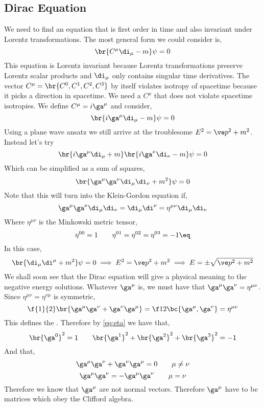 \documentclass{article}
\begin{document}
\subsection{Dirac Equation}
We need to find an equation that is first order in time and also invariant under Lorentz transformations. The most general form we could consider is,
\[ \br{C^{\mu} \di_{\mu} - m }\psi = 0 \]
This equation is Lorentz invariant because Lorentz transformations preserve Lorentz scalar products and $\di_{\mu}$ only contains singular time derivatives. The vector $C^{\mu} = \br{C^{0}, C^{1}, C^{2}, C^{3}}$ by itself violates isotropy of spacetime because it picks a direction in spacetime. We need a $C^{\mu}$ that does not violate spacetime isotropies. We define $C^{\mu} = i \ga^{\mu}$ and consider,
\[ \br{i \ga^{\mu} \di_{\mu} - m }\psi = 0 \]
Using a plane wave ansatz we still arrive at the troublesome $E^{2} = \ve p^2 + m^2$. Instead let's try
\[ \br{i \ga^{\mu} \di_{\mu} + m }\br{i \ga^{\nu} \di_{\nu} - m }\psi = 0 \]
Which can be simplified as a sum of squares,
\[ \br{\ga^{\mu} \ga^{\nu} \di_{\mu} \di_{\nu} + m^2}\psi = 0 \]
Note that this will turn into the Klein-Gordon equation if,
\[ \ga^{\mu} \ga^{\nu} \di_{\mu} \di_{\nu} = \di_{\mu} \di^{\nu} = \eta^{\mu \nu} \di_{\mu} \di_{\nu} \]
Where $\eta^{\mu\nu}$ is the Minkowski metric tensor,
\[ \eta^{00} = 1 \qquad \eta^{01} = \eta^{02} = \eta^{03} = -1 \eq \label{eq:eta}\]
In this case,
\[ \br{\di_{\mu} \di^{\mu} + m^2} \psi = 0 \implies E^2 = \ve p^2 + m^2 \implies E = \pm \sqrt{\ve p^2 + m^2} \]
We shall soon see that the Dirac equation will give a physical meaning to the negative energy solutions. Whatever $\ga^{\mu}$ is, we must have that $\ga^{\mu} \ga^{\nu} = \eta^{\mu \nu}$. Since $\eta^{\mu \nu} = \eta^{\nu \mu}$ is symmetric,
\[ \f{1}{2}\br{\ga^{\mu} \ga^{\nu} + \ga^{\nu} \ga^{\mu}} = \f12 \bc{\ga^{\mu}, \ga^{\nu}} = \eta^{\mu \nu} \]
This defines the . Therefore by \cref{eq:eta} we have that,
\[ \br{\ga^{0}}^{2} = 1 \qquad \br{\ga^{1}}^{2} + \br{\ga^{2}}^{2} + \br{\ga^{3}}^{2} = -1 \]
And that,
\[ \ga^{\mu} \ga^{\nu} + \ga^{\nu} \ga^{\mu} = 0 \qquad \mu \neq \nu \]
\[ \ga^{\mu} \ga^{\nu} = - \ga^{\mu} \ga^{\nu} \qquad \mu = \nu \]
Therefore we know that $\ga^{\mu}$ are not normal vectors. Therefore $\ga^{\mu}$ have to be matrices which obey the Clifford algebra.\\
\end{document}
